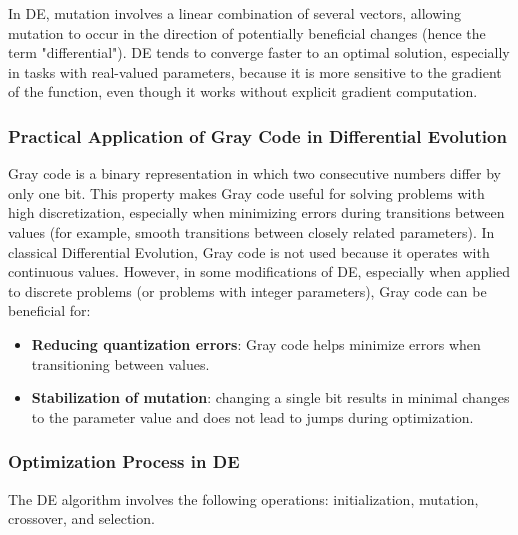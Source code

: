 \documentclass{styles/svproc}
\begin{document}
In DE, mutation involves a linear combination of several vectors, allowing mutation to occur in the direction of potentially beneficial changes (hence the term "differential"). DE tends to converge faster to an optimal solution, especially in tasks with real-valued parameters, because it is more sensitive to the gradient of the function, even though it works without explicit gradient computation.

\subsubsection{Practical Application of Gray Code in Differential Evolution}

Gray code is a binary representation in which two consecutive numbers differ by only one bit. This property makes Gray code useful for solving problems with high discretization, especially when minimizing errors during transitions between values (for example, smooth transitions between closely related parameters). In classical Differential Evolution, Gray code is not used because it operates with continuous values. However, in some modifications of DE, especially when applied to discrete problems (or problems with integer parameters), Gray code can be beneficial for:
\begin{itemize}
    \item \textbf{Reducing quantization errors}: Gray code helps minimize errors when transitioning between values.
    \item \textbf{Stabilization of mutation}: changing a single bit results in minimal changes to the parameter value and does not lead to jumps during optimization.
\end{itemize}

\subsubsection{Optimization Process in DE}\label{optimization-process-de}

The DE algorithm involves the following operations: initialization, mutation, crossover, and selection.
\end{document}
